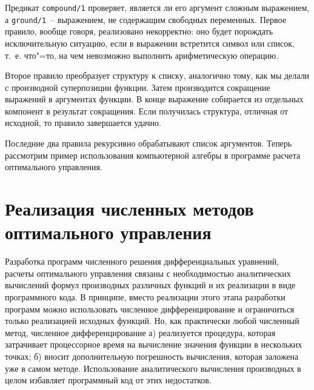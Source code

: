 \documentclass[a4paper,14pt, openany, twoside, draft]{extbook} %
\begin{document}
Предикат \texttt{compound/1} проверяет, является ли его аргумент сложным выражением, а \texttt{ground/1}~-- выражением, не содержащим свободных переменных.  Первое правило, вообще говоря, реализовано некорректно: оно будет порождать исключительную ситуацию, если в выражении встретится символ или список, т.~е. что"=то, на чем невозможно выполнить арифметическую операцию.

Второе правило преобразует структуру к списку, аналогично тому, как мы делали с производной суперпозиции функции.  Затем производится сокращение выражений в аргументах функции.  В конце выражение собирается из отдельных компонент в результат сокращения.  Если получилась структура, отличная от исходной, то правило завершается удачно.

Последние два правила рекурсивно обрабатывают список аргументов.  Теперь рассмотрим пример использования компьютерной алгебры в программе расчета оптимального управления.

\section{Реализация численных методов оптимального управления}
\label{sec:optcontr}
\lstset{language=Python}

\newcommand{\vecx}{\mathbfit{x}}
\newcommand{\vecf}{\mathbfit{f}}
\newcommand{\vecg}{\mathbfit{g}}
\newcommand{\vecu}{\mathbfit{u}}
\newcommand{\vecpsi}{\mathbfit{\psi}}
\newcommand{\vecH}{\mathbfit{H}}

Разработка программ численного решения дифференциальных уравнений, расчеты оптимального управления связаны с необходимостью аналитических вычислений формул производных различных функций и их реализации в виде программного кода.  В принципе, вместо реализации этого этапа разработки программ можно использовать численное дифференцирование и ограничиться только реализацией исходных функций.  Но, как практически любой численный метод, численное дифференцирование а) реализуется процедура, которая затрачивает процессорное время на вычисление значения функции в нескольких точках; б) вносит дополнительную погрешность вычисления, которая заложена уже в самом методе.  Использование аналитического вычисления производных в целом избавляет программный код от этих недостатков.
\end{document}
